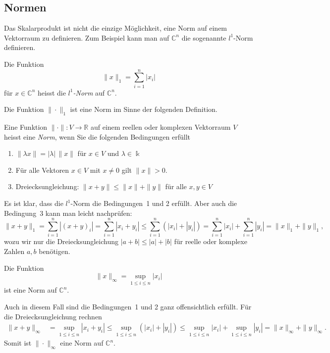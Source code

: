 %
%
\subsection{Normen
\label{skalarprodukt:cauchyschwarz:subsection:norm}}
Das Skalarprodukt ist nicht die einzige Möglichkeit, eine Norm auf
einem Vektorraum zu definieren.
Zum Beispiel kann man auf $\mathbb{C}^n$ die sogenannte $l^1$-Norm
definieren.

\begin{definition}
Die Funktion
\[
\|x\|_1
=
\sum_{i=1}^n |x_i|
\]
für $x\in\mathbb{C}^n$ heisst die {\em $l^1$-Norm} auf $\mathbb{C}^n$.
\end{definition}

Die Funktion $\|\cdot\|_1$ ist eine Norm im Sinne der folgenden Definition.

\begin{definition}
Eine Funktion $\|\cdot\| \colon V\to\mathbb{R}$ auf einem reellen
oder komplexen Vektorraum $V$ heisst eine {\em Norm}, wenn Sie die
folgenden Bedingungen erfüllt
\begin{enumerate}
\item
$\|\lambda x\| = |\lambda|\, \|x\|$ für $x\in V$ und $\lambda\in \Bbbk$
\item
Für alle Vektoren $x\in V$ mit $x\ne 0$ gilt $\|x\|>0$.
\item
Dreiecksungleichung: $\|x+y\| \le \|x\| + \|y\|$ für alle $x,y\in V$
\end{enumerate}
\end{definition}

Es ist klar, dass die $l^1$-Norm die Bedingungen~1 und 2 erfüllt.
Aber auch die Bedingung~3 kann man leicht  nachprüfen:
\[
\|x+y\|_1
=
\sum_{i=1}^n |(x+y)_i|
=
\sum_{i=1}^n |x_i+y_i|
\le
\sum_{i=1}^n(|x_i|+|y_i|)
=
\sum_{i=1}^n|x_i|
+
\sum_{i=1}^n|y_i|
=
\|x\|_1 + \|y\|_1,
\]
wozu wir nur die Dreiecksungleichung $|a+b|\le |a| + |b|$ für reelle 
oder komplexe Zahlen $a,b$ benötigen.

\begin{beispiel}
Die Funktion
\[
\|x\|_\infty = \sup_{1\le i\le n} |x_i|
\]
ist eine Norm auf $\mathbb{C}^n$.
\end{beispiel}

Auch in diesem Fall sind die Bedingungen~1 und 2 ganz offensichtlich erfüllt.
Für die Dreiecksungleichung rechnen
\begin{align*}
\|x+y\|_\infty
&=
\sup_{1\le i\le n} |x_i+y_i|
\le
\sup_{1\le i\le n} (|x_i|+|y_i|)
\le
\sup_{1\le i\le n} |x_i|+\sup_{1\le i\le n}|y_i|
=
\|x\|_\infty + \|y\|_\infty.
\end{align*}
Somit ist $\|\cdot\|_\infty$ eine Norm auf $\mathbb{C}^n$.

